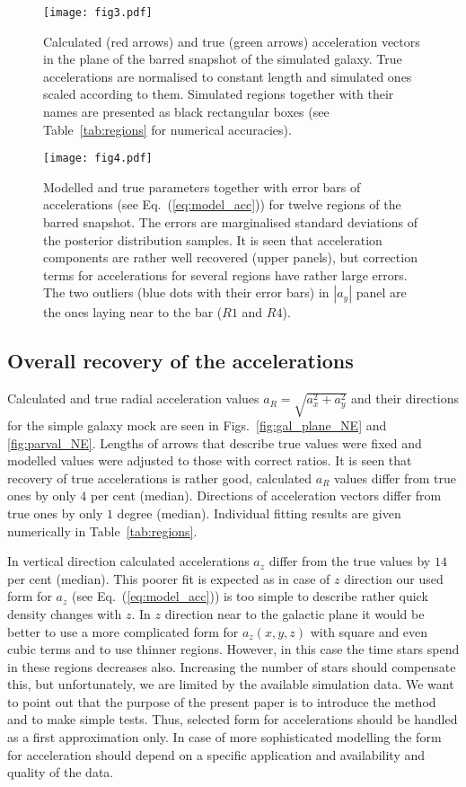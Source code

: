 \documentclass[fleqn,usenatbib]{mnras}
\begin{document}
\begin{figure*}
	\texttt{[image: fig3.pdf]}
	\caption{Calculated (red arrows) and true (green arrows) acceleration vectors in the plane of the barred snapshot of the simulated galaxy. True accelerations are normalised to constant length and simulated ones scaled according to them. Simulated regions together with their names are presented as black rectangular boxes (see Table~\ref{tab:regions} for numerical accuracies). 
}\label{fig:gal_plane}
\end{figure*}

\begin{figure*}
	\texttt{[image: fig4.pdf]}
	\caption{Modelled and true parameters together with error bars of accelerations (see Eq.~(\ref{eq:model_acc})) for twelve regions of the barred snapshot. The errors are marginalised standard deviations of the posterior distribution samples. It is seen that acceleration components are rather well recovered (upper panels), but correction terms for accelerations for several regions have rather large errors. The two outliers (blue dots with their error bars) in $|a_y|$ panel are the ones laying near to the bar ($R1$ and $R4$).} \label{fig:parval}
\end{figure*}

\subsection{Overall recovery of the accelerations}

Calculated and true radial acceleration values $a_R = \sqrt{a_x^2 + a_y^2}$ and their directions for the simple galaxy mock are seen in Figs.~\ref{fig:gal_plane_NE} and \ref{fig:parval_NE}. Lengths of arrows that describe true values were fixed and modelled values were adjusted to those with correct ratios. It is seen that recovery of true accelerations is rather good, calculated $a_R$ values differ from true ones by only $4$ per cent (median). Directions of acceleration vectors differ from true ones by only $1$ degree (median). Individual fitting results are given numerically in Table~\ref{tab:regions}. 

In vertical direction calculated accelerations $a_z$ differ from the true values by $14$ per cent (median). This poorer fit is expected as in case of $z$ direction our used form for $a_z$ (see Eq.~(\ref{eq:model_acc})) is too simple to describe rather quick density changes with $z$. In $z$ direction near to the galactic plane it would be better to use a more complicated form for $a_z (x,y,z)$ with square and even cubic terms and to use thinner regions. However, in this case the time stars spend in these regions decreases also. Increasing the number of stars should compensate this, but unfortunately, we are limited by the available simulation data. We want to point out that the purpose of the present paper is to introduce the method and to make simple tests. Thus, selected form for accelerations should be handled as a first approximation only. In case of more sophisticated modelling the form for acceleration should depend on a specific application and availability and quality of the data. 
\end{document}
